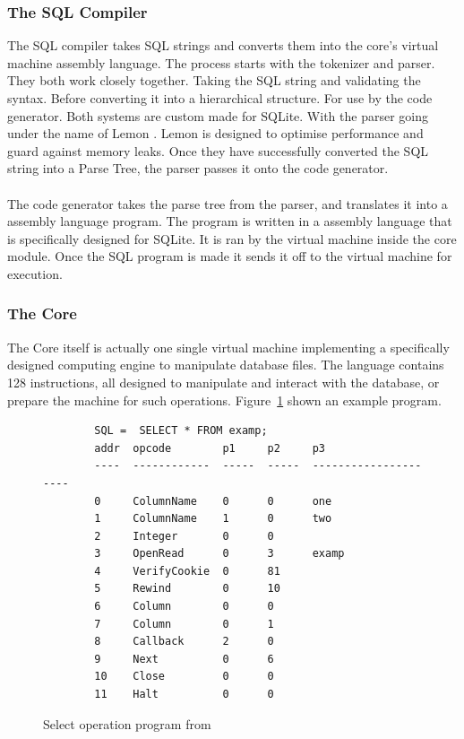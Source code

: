 \subsubsection{The SQL Compiler}
\label{subsec:how_sqlite_compiler}

The SQL compiler takes SQL strings and converts them into the core's virtual machine assembly language. The process starts with the tokenizer and parser. They both work closely together. Taking the SQL string and validating the syntax. Before converting it into a hierarchical structure. For use by the code generator. Both systems are custom made for SQLite. With the parser going under the name of Lemon \citep{sqlitedefguide}. Lemon is designed to optimise performance and guard against memory leaks. Once they have successfully converted the SQL string into a Parse Tree, the parser passes it onto the code generator.
\\\\
The code generator takes the parse tree from the parser, and translates it into a assembly language program. The program is written in a assembly language that is specifically designed for SQLite. It is ran by the virtual machine inside the core module. Once the SQL program is made it sends it off to the virtual machine for execution.

\subsubsection{The Core}
\label{subsec:how_sqlite_core}

The Core itself is actually one single virtual machine implementing a specifically designed computing engine to manipulate database files. The language contains 128 instructions, all designed to manipulate and interact with the database, or prepare the machine for such operations. Figure~\ref{fig:vm_code} shown an example program. 
\begin{figure}[H]
	\centering
	\begin{lstlisting} 
		SQL =  SELECT * FROM examp;
		addr  opcode        p1     p2     p3                                 
		----  ------------  -----  -----  ---------------------
		0     ColumnName    0      0      one                                
		1     ColumnName    1      0      two                                
		2     Integer       0      0                                         
		3     OpenRead      0      3      examp                              
		4     VerifyCookie  0      81                                        
		5     Rewind        0      10                                        
		6     Column        0      0                                         
		7     Column        0      1                                         
		8     Callback      2      0                                         
		9     Next          0      6                                         
		10    Close         0      0                                         
		11    Halt          0      0
	\end{lstlisting}
	\caption{Select operation program from \cite{sqlite}}
	\label{fig:vm_code}
\end{figure}

